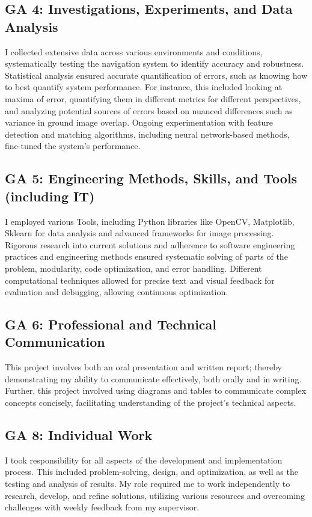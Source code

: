 \subsection*{GA 4: Investigations, Experiments, and Data Analysis}
I collected extensive data across various environments and conditions, systematically testing the navigation system to identify accuracy and robustness. Statistical analysis ensured accurate quantification of errors, such as knowing how to best quantify system performance. For instance, this included looking at maxima of error, quantifying them in different metrics for different perspectives, and analyzing potential sources of errors based on nuanced differences such as variance in ground image overlap. Ongoing experimentation with feature detection and matching algorithms, including neural network-based methods, fine-tuned the system's performance.

\subsection*{GA 5: Engineering Methods, Skills, and Tools (including IT)}
I employed various Tools, including Python libraries like OpenCV, Matplotlib, Sklearn for data analysis and advanced frameworks for image processing. Rigorous research into current solutions and adherence to software engineering practices and engineering methods ensured systematic solving of parts of the problem, modularity, code optimization, and error handling. Different computational techniques allowed for precise text and visual feedback for evaluation and debugging, allowing continuous optimization.

\subsection*{GA 6: Professional and Technical Communication}
This project involves both an oral presentation and written report; thereby demonstrating my ability to communicate effectively, both orally and in writing. Further, this project involved using diagrams and tables to communicate complex concepts concisely, facilitating understanding of the project's technical aspects.

\subsection*{GA 8: Individual Work}
I took responsibility for all aspects of the development and implementation process. This included problem-solving, design, and optimization, as well as the testing and analysis of results. My role required me to work independently to research, develop, and refine solutions, utilizing various resources and overcoming challenges with weekly feedback from my supervisor.

